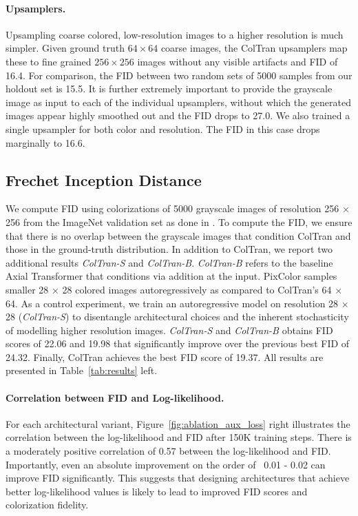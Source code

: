 \documentclass{article} \usepackage{iclr2021_conference,times}
\begin{document}
\paragraph{Upsamplers.} Upsampling coarse colored, low-resolution images to a higher resolution is much simpler. Given ground truth $64 \times 64$ coarse images, the ColTran upsamplers map these to fine grained $256 \times 256$ images without any visible artifacts and FID of 16.4. For comparison, the FID between two random sets of 5000 samples from our holdout set is 15.5. It is further extremely important to provide the grayscale image as input to each of the individual upsamplers, without which the generated images appear highly smoothed out and the FID drops to 27.0. We also trained a single upsampler for both color and resolution. The FID in this case drops marginally to 16.6.



\subsection{Frechet Inception Distance}
\label{comparison_expts}

We compute FID using colorizations of 5000 grayscale images of resolution 256 $\times$ 256 from the ImageNet validation set as done in \citep{ardizzone2019guided}. To compute the FID, we ensure that there is no overlap between the grayscale images that condition ColTran and those in the ground-truth distribution. In addition to ColTran, we report two additional results \textit{ColTran-S} and \textit{ColTran-B}. \textit{ColTran-B} refers to the baseline Axial Transformer that conditions via addition at the input. PixColor samples smaller 28 $\times$ 28 colored images autoregressively as compared to ColTran's 64 $\times$ 64. As a control experiment, we train an autoregressive model on resolution 28 $\times$ 28 (\textit{ColTran-S}) to disentangle architectural choices and the inherent stochasticity of modelling higher resolution images. \textit{ColTran-S} and \textit{ColTran-B} obtains FID scores of 22.06 and 19.98 that significantly improve over the previous best FID of 24.32. Finally, ColTran achieves the best FID score of 19.37. All results are presented in Table~\ref{tab:results} left.

\paragraph{Correlation between FID and Log-likelihood.} For each architectural variant, Figure~\ref{fig:ablation_aux_loss} right illustrates the correlation between the log-likelihood and FID after 150K training steps. There is a moderately positive correlation of 0.57 between the log-likelihood and FID. Importantly, even an absolute improvement on the order of ~0.01 - 0.02 can improve FID significantly. This suggests that designing architectures that achieve better log-likelihood values is likely to lead to improved FID scores and colorization fidelity.
\end{document}
